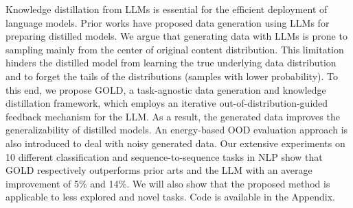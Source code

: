 Knowledge distillation from LLMs is essential for the efficient deployment of language models. Prior works have proposed data generation using LLMs for preparing distilled models. We argue that generating data with LLMs is prone to sampling mainly from the center of original content distribution. This limitation hinders the distilled model from learning the true underlying data distribution and to forget the tails of the distributions (samples with lower probability). To this end, we propose GOLD, a task-agnostic data generation and knowledge distillation framework, which employs an iterative out-of-distribution-guided feedback mechanism for the LLM. As a result, the generated data improves the generalizability of distilled models. An energy-based OOD evaluation approach is also introduced to deal with noisy generated data. Our extensive experiments on 10 different classification and sequence-to-sequence tasks in NLP show that GOLD respectively outperforms prior arts and the LLM with an average improvement of 5\% and 14\%. We will also show that the proposed method is applicable to less explored and novel tasks. Code is available in the Appendix.